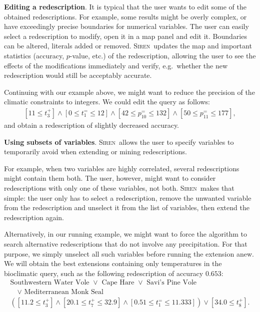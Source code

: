 \documentclass{llncs}
\newcommand{\prg}[1]{\textbf{#1}.}
\newcommand{\Siren}{\textsc{Siren}}
\begin{document}
\prg{Editing a redescription} It is typical that the user wants to
edit some of the obtained redescriptions. For example, some results
might be overly complex, or have exceedingly precise boundaries for
numerical variables. The user can easily select a redescription to
modify, open it in a map panel and edit it. Boundaries can be altered,
literals added or removed. \Siren\ updates the map and important
statistics (accuracy, $p$-value, etc.) of the redescription, allowing
the user to see the effects of the modifications immediately and
verify, e.g.\ whether the new redescription would still be acceptably
accurate.

Continuing with our example above, we might want to reduce the
precision of the climatic constraints to integers. We could edit the
query as follows:
\begin{equation*}
\begin{array}{l}
[11 \leq t_{3}^{+}] \land  [0 \leq t_{1}^{=} \leq 12]%
\land  [42 \leq p_{10}^{=} \leq 132] \land [50 \leq p_{11}^{=} \leq 177],
\end{array}
\end{equation*}
and obtain a redescription of slightly decreased accuracy. %

\prg{Using subsets of variables} 
\Siren\ allows the user to specify variables to temporarily 
avoid when extending or mining redescriptions.

For example, when two variables are highly
correlated, several redescriptions might contain them
both. The user, however, might want to consider
redescriptions with only one of these variables, not
both. \Siren\ makes that simple: the user only has to select a
redescription, remove the unwanted variable from the
redescription and unselect it from the list of variables, then extend the
redescription again. 

Alternatively, in our running example, we might want to force the
algorithm to search alternative redescriptions that do not involve any
 precipitation. For that purpose, we simply unselect all such
variables before running the extension anew. We will obtain the best
extensions containing only temperatures in the bioclimatic query, such
as the following redescription of accuracy $0.653$:
\begin{equation*}
\begin{array}{l}
\text{Southwestern Water Vole }\lor\text{ Cape Hare }\lor\text{ Savi's Pine Vole }\\[1mm]
\quad\lor\text{ Mediterranean Monk Seal}\\[3mm]
( [11.2 \leq t_{3}^{+}] \land  [20.1 \leq t_{7}^{+} \leq 32.9] %
\land  [0.51 \leq t_{1}^{=} \leq 11.333]) \lor  [34.0 \leq t_{8}^{+}].
\end{array}
\end{equation*}
\end{document}
